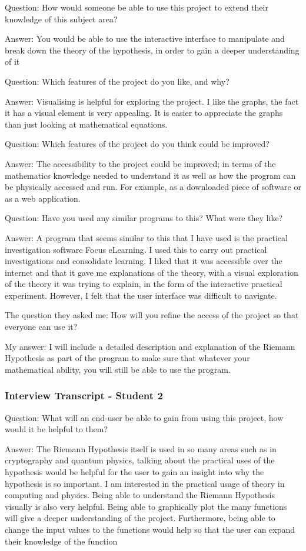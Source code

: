 \documentclass{article}
\begin{document}
Question: How would someone be able to use this project to extend their knowledge of this subject area?

Answer: You would be able to use the interactive interface to manipulate and break down the theory of the hypothesis, in order to gain a deeper understanding of it

Question: Which features of the project do you like, and why?

Answer: Visualising is helpful for exploring the project. I like the graphs, the fact it has a visual element is very appealing. It is easier to appreciate the graphs than just looking at mathematical equations.

Question: Which features of the project do you think could be improved?

Answer: The accessibility to the project could be improved; in terms of the mathematics knowledge needed to understand it as well as how the program can be physically accessed and run. For example, as a downloaded piece of software or as a web application.

Question: Have you used any similar programs to this? What were they like?

Answer: A program that seems similar to this that I have used is the practical investigation software Focus eLearning. I used this to carry out practical investigations and consolidate learning. I liked that it was accessible over the internet and that it gave me explanations of the theory, with a visual exploration of the theory it was trying to explain, in the form of the interactive practical experiment. However, I felt that the user interface was difficult to navigate.

The question they asked me: How will you refine the access of the project so that everyone can use it?

My answer: I will include a detailed description and explanation of the Riemann Hypothesis as part of the program to make sure that whatever your mathematical ability, you will still be able to use the program.

\subsubsection{Interview Transcript - Student 2}

Question: What will an end-user be able to gain from using this project, how would it be helpful to them?

Answer: The Riemann Hypothesis itself is used in so many areas such as in cryptography and quantum physics, talking about the practical uses of the hypothesis would be helpful for the user to gain an insight into why the hypothesis is so important.  I am interested in the practical usage of theory in computing and physics. Being able to understand the Riemann Hypothesis visually is also very helpful. Being able to graphically plot the many functions will give a deeper understanding of the project. Furthermore, being able to change the input values to the functions would help so that the user can expand their knowledge of the function
\end{document}
